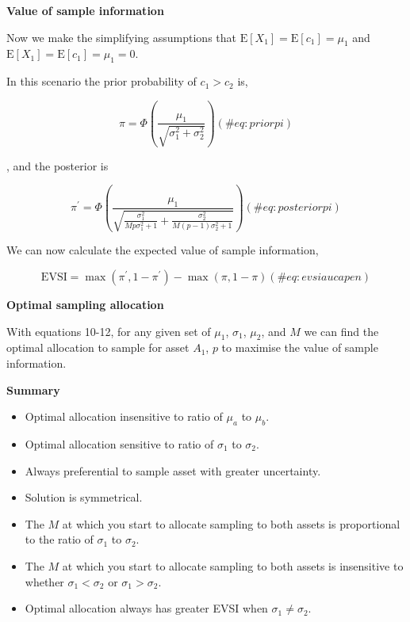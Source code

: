 \textbf{Value of sample information}

Now we make the simplifying assumptions that
\(\mathrm{E}[X_1]=\mathrm{E}[c_1]=\mu_1\) and
\(\mathrm{E}[X_1]=\mathrm{E}[c_1]=\mu_1=0\).

In this scenario the prior probability of \(c_1>c_2\) is,

\begin{equation}
\pi=\Phi\left(\frac{\mu_1}{\sqrt{\sigma^2_1+\sigma^2_2}}\right)
(\#eq:priorpi)
\end{equation}

, and the posterior is

\begin{equation}
\pi^\prime=\Phi\left(\frac{\mu_1}{\sqrt{\frac{\sigma^2_1}{Mp\sigma^2_1 + 1}+\frac{\sigma^2_2}{M(p-1)\sigma^2_2 + 1}}}\right)
(\#eq:posteriorpi)
\end{equation}

We can now calculate the expected value of sample information,

\begin{equation}
\mathrm{EVSI}=\max(\pi^{\prime}, 1-\pi^{\prime})-\max(\pi, 1-\pi)
(\#eq:evsiaucapen)
\end{equation}

\textbf{Optimal sampling allocation}

With equations 10-12, for any given set of \(\mu_1\), \(\sigma_1\),
\(\mu_2\), and \(M\) we can find the optimal allocation to sample for
asset \(A_1\), \(p\) to maximise the value of sample information.

\textbf{Summary}

\begin{itemize}
\tightlist
\item
  Optimal allocation insensitive to ratio of \(\mu_a\) to \(\mu_b\).
\item
  Optimal allocation sensitive to ratio of \(\sigma_1\) to \(\sigma_2\).
\item
  Always preferential to sample asset with greater uncertainty.
\item
  Solution is symmetrical.
\item
  The \(M\) at which you start to allocate sampling to both assets is
  proportional to the ratio of \(\sigma_1\) to \(\sigma_2\).
\item
  The \(M\) at which you start to allocate sampling to both assets is
  insensitive to whether \(\sigma_1 < \sigma_2\) or
  \(\sigma_1 > \sigma_2\).
\item
  Optimal allocation always has greater EVSI when
  \(\sigma_1 \neq \sigma_2\).
\end{itemize}

